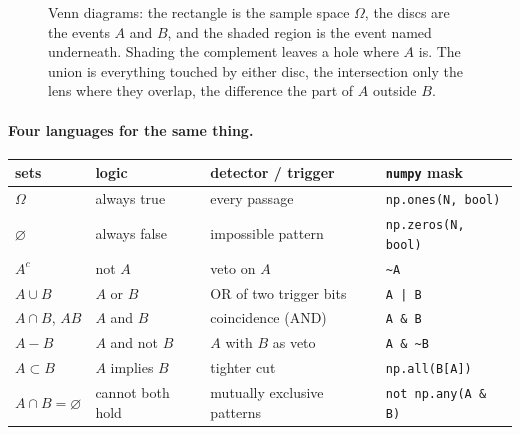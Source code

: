 \begin{figure}[htbp]
\centering
{}
\caption{Venn diagrams: the rectangle is the sample space $\Omega$, the discs
are the events $A$ and $B$, and the shaded region is the event named
underneath. Shading the complement leaves a hole where $A$ is. The union is
everything touched by either disc, the intersection only the lens where they
overlap, the difference the part of $A$ outside $B$.}
\label{1a:fig:venn-ops}
\end{figure}

\paragraph{Four languages for the same thing.}
\begin{center}\small
\begin{tabular}{@{}llll@{}}
\toprule
sets & logic & detector / trigger & \texttt{numpy} mask\\
\midrule
$\Omega$ & always true & every passage & \texttt{np.ones(N, bool)}\\
$\varnothing$ & always false & impossible pattern & \texttt{np.zeros(N, bool)}\\
$A^c$ & not $A$ & veto on $A$ & \texttt{\textasciitilde A}\\
$A\cup B$ & $A$ or $B$ & OR of two trigger bits & \texttt{A | B}\\
$A\cap B$, $AB$ & $A$ and $B$ & coincidence (AND) & \texttt{A \& B}\\
$A-B$ & $A$ and not $B$ & $A$ with $B$ as veto & \texttt{A \& \textasciitilde B}\\
$A\subset B$ & $A$ implies $B$ & tighter cut & \texttt{np.all(B[A])}\\
$A\cap B=\varnothing$ & cannot both hold & mutually exclusive patterns & \texttt{not np.any(A \& B)}\\
\bottomrule
\end{tabular}
\end{center}

